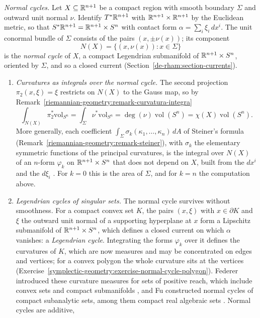 \begin{remark}\label{symplectic-geometry:remark-normal-cycles}
\emph{Normal cycles.} Let $X \subseteq \mathbb{R}^{n+1}$ be a compact region with smooth boundary $\Sigma$ and outward unit normal $\nu$. Identify $T^*\mathbb{R}^{n+1}$ with $\mathbb{R}^{n+1} \times \mathbb{R}^{n+1}$ by the Euclidean metric, so
that $S^*\mathbb{R}^{n+1} = \mathbb{R}^{n+1} \times S^n$ with contact form $\alpha = \sum_i\xi_i\,dx^i$. The unit conormal bundle of $\Sigma$ consists of the pairs $(x, \pm\nu(x))$; its component
\[
N(X) = \{(x, \nu(x)) : x \in \Sigma\}
\]
is the \emph{normal cycle} of $X$, a compact Legendrian submanifold of $\mathbb{R}^{n+1} \times S^n$, oriented by $\Sigma$, and so a closed current (Section~\ref{de-rham:section-currents}).
\begin{enumerate}
\item \emph{Curvatures as integrals over the normal cycle.} The second projection $\pi_2(x, \xi) = \xi$ restricts on $N(X)$ to the Gauss map, so by Remark~\ref{riemannian-geometry:remark-curvatura-integra}
\[
\int_{N(X)}\pi_2^*\mathrm{vol}_{S^n} = \int_\Sigma\nu^*\mathrm{vol}_{S^n} = \deg(\nu)\operatorname{vol}(S^n) = \chi(X)\operatorname{vol}(S^n) .
\]
More generally, each coefficient $\int_\Sigma\sigma_k(\kappa_1, \ldots, \kappa_n)\,dA$ of Steiner's formula (Remark~\ref{riemannian-geometry:remark-steiner}), with $\sigma_k$ the elementary symmetric functions of the principal
curvatures, is the integral over $N(X)$ of an $n$-form $\varphi_k$ on $\mathbb{R}^{n+1} \times S^n$ that does not depend on $X$, built from the $dx^i$ and the $d\xi_i$ \cite{fu-1994}. For $k = 0$ this is the area of
$\Sigma$, and for $k = n$ the computation above.
\item \emph{Legendrian cycles of singular sets.} The normal cycle survives without smoothness. For a compact convex set $K$, the pairs $(x, \xi)$ with $x \in \partial K$ and $\xi$ the outward unit normal of a
supporting hyperplane at $x$ form a Lipschitz submanifold of $\mathbb{R}^{n+1} \times S^n$, which defines a closed current on which $\alpha$ vanishes: a \emph{Legendrian cycle}. Integrating the forms $\varphi_k$ over it defines the
curvatures of $K$, which are now measures and may be concentrated on edges and vertices; for a convex polygon the whole curvature sits at the vertices
(Exercise~\ref{symplectic-geometry:exercise-normal-cycle-polygon}). Federer introduced these curvature measures for sets of positive reach, which include convex sets and compact submanifolds
\cite{federer-1959}, and Fu constructed normal cycles of compact subanalytic sets, among them compact real algebraic sets \cite{fu-1994}. Normal cycles are additive,

\end{enumerate}
\end{remark}
